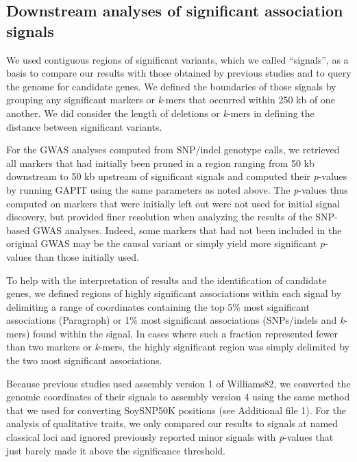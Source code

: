\subsection*{Downstream analyses of significant association signals}
\label{sv-gwas-methods-downstream}

We used contiguous regions of significant variants, which we called
``signals'', as a basis to compare our results with those obtained by previous
studies and to query the genome for candidate genes. We defined the boundaries
of those signals by grouping any significant markers or \emph{k}-mers that
occurred within 250 kb of one another.  We did consider the length of deletions
or \emph{k}-mers in defining the distance between significant variants.

For the GWAS analyses computed from SNP/indel genotype calls, we retrieved all
markers that had initially been pruned in a region ranging from 50 kb
downstream to 50 kb upstream of significant signals and computed their
\emph{p}-values by running GAPIT using the same parameters as noted above. The
\emph{p}-values thus computed on markers that were initially left out were not
used for initial signal discovery, but provided finer resolution when analyzing
the results of the SNP-based GWAS analyses. Indeed, some markers that had not
been included in the original GWAS may be the causal variant or simply yield
more significant \emph{p}-values than those initially used.

To help with the interpretation of results and the identification of candidate
genes, we defined regions of highly significant associations within each signal
by delimiting a range of coordinates containing the top 5\% most significant
associations (Paragraph) or 1\% most significant associations (SNPs/indels
and \emph{k}-mers) found within the signal. In cases where such a fraction
represented fewer than two markers or \emph{k}-mers, the highly significant
region was simply delimited by the two most significant associations.

Because previous studies \citep{bandillo2015, bandillo2017} used assembly version 1 of
Williams82, we converted the genomic coordinates of their signals to assembly version 4
using the same method that we used for converting
SoySNP50K positions (see Additional file 1). For the analysis of
qualitative traits, we only compared our results to signals at named classical
loci and ignored previously reported minor signals with \emph{p}-values that
just barely made it above the significance threshold.

